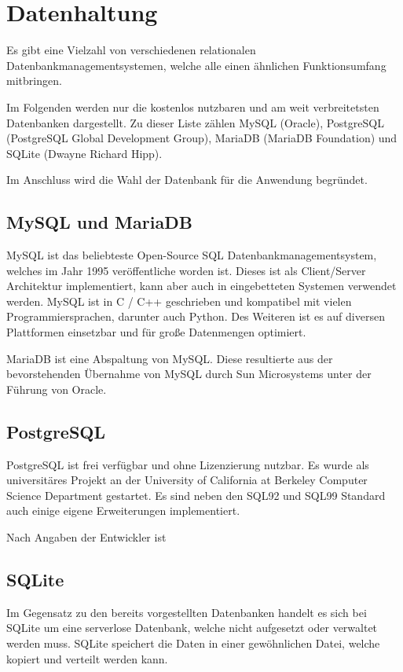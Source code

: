 \section{Datenhaltung} \label{sec:Datenhaltung}
Es gibt eine Vielzahl von verschiedenen relationalen Datenbankmanagementsystemen, welche alle einen ähnlichen Funktionsumfang mitbringen.

Im Folgenden werden nur die kostenlos nutzbaren und am weit verbreitetsten Datenbanken dargestellt. Zu dieser Liste zählen MySQL (Oracle), PostgreSQL (PostgreSQL Global Development Group), MariaDB (MariaDB Foundation) und SQLite (Dwayne Richard Hipp). \cite{db-enginesDBEnginesRanking}

Im Anschluss wird die Wahl der Datenbank für die Anwendung begründet.

\subsection{MySQL und MariaDB}
MySQL ist das beliebteste Open-Source SQL Datenbankmanagementsystem, welches im Jahr 1995 veröffentliche worden ist. Dieses ist als Client/Server Architektur implementiert, kann aber auch in eingebetteten Systemen verwendet werden. \cite{oraclecorporationMySQLMySQLReference2020} MySQL ist in C / C++ geschrieben und kompatibel mit vielen Programmiersprachen, darunter auch Python. Des Weiteren ist es auf diversen Plattformen einsetzbar und für große Datenmengen optimiert. \cite{oraclecorporationMySQLMySQLReference2020a}

MariaDB ist eine Abspaltung von MySQL. Diese resultierte aus der bevorstehenden Übernahme von MySQL durch Sun Microsystems unter der Führung von Oracle. \cite{ionosMariaDBVsMySQL2020}

\subsection{PostgreSQL}
PostgreSQL ist frei verfügbar und ohne Lizenzierung nutzbar. Es wurde als universitäres Projekt an der University of California at Berkeley Computer Science Department gestartet. Es sind neben den SQL92 und SQL99 Standard auch einige eigene Erweiterungen implementiert. \cite{boenigkWasIstPostgreSQL} 

Nach Angaben der Entwickler ist  

\subsection{SQLite}
Im Gegensatz zu den bereits vorgestellten Datenbanken handelt es sich bei SQLite um eine serverlose Datenbank, welche nicht aufgesetzt oder verwaltet werden muss. SQLite speichert die Daten in einer gewöhnlichen Datei, welche kopiert und verteilt werden kann. \cite{sqliteFeaturesSQLite}


